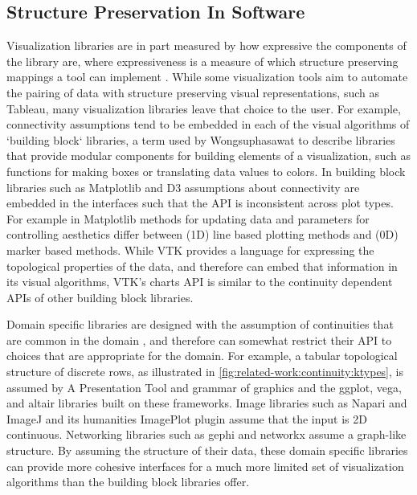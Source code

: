 \documentclass[journal]{IEEEtran}
\theoremstyle{definition}
\theoremstyle{remark}
\begin{document}
\subsection{Structure Preservation In Software}
\label{sec:related-work:software}
Visualization libraries are in part measured by how expressive the components of the library are, where expressiveness is a measure of which structure preserving mappings a tool can implement \cite{mackinlayAutomatingDesignGraphical1986}. While some visualization tools aim to automate the pairing of data with structure preserving visual representations, such as Tableau\cite{StoltePolaris2002,hanrahanVizQL2006,MackinlayShowme2007}, many visualization libraries leave that choice to the user. For example, connectivity assumptions tend to be embedded in each of the visual algorithms of `building block` libraries, a term used by Wongsuphasawat \cite{wongsuphasawatNavigatingWideWorld2021,wongsuphasawatNavigatingWideWorld2020} to describe libraries that provide modular components for building elements of a visualization, such as functions for making boxes or translating data values to colors. In building block libraries such as Matplotlib\cite{hunterMatplotlib2DGraphics2007} and D3\cite{bostockDataDrivenDocuments2011} assumptions about connectivity are embedded in the interfaces such that the API is inconsistent across plot types. For example in Matplotlib methods for updating data and parameters for controlling aesthetics differ between (1D) line based plotting methods and (0D) marker based methods. While VTK\cite{hanwellVisualizationToolkitVTK2015,geveciVTK2012} provides a language for expressing the topological properties of the data, and therefore can embed that information in its visual algorithms, VTK's charts API is similar to the continuity dependent APIs of other building block libraries.

Domain specific libraries are designed with the assumption of continuities that are common in the domain \cite{HeerSoftware2006}, and therefore can somewhat restrict their API to choices that are appropriate for the domain. For example, a tabular topological structure of discrete rows, as illustrated in \autoref{fig:related-work:continuity:ktypes}, is assumed by A Presentation Tool\cite{mackinlayAutomatingDesignGraphical1986, mackinlayAutomatingDesignGraphical1986} and grammar of graphics\cite{wilkinsonGrammarGraphics2005} and the ggplot\cite{wickhamGgplot2ElegantGraphics2016}, vega\cite{satyanarayanDeclarativeInteractionDesign2014}, and altair\cite{vanderplasAltairInteractiveStatistical2018} libraries built on these frameworks. Image libraries such as Napari\cite{nicholas_sofroniew_2021_4533308} and ImageJ\cite{schneiderNIHImageImageJ2012} and its humanities ImagePlot\cite{studiesCulturevisImageplot2021} plugin assume that the input is 2D continuous. Networking libraries such as gephi\cite{bastianGephiOpenSource2009} and networkx\cite{HagbergExploringNetwork2008} assume a graph-like structure. By assuming the structure of their data, these domain specific libraries can provide more cohesive interfaces for a much more limited set of visualization algorithms than the building block libraries offer.
\end{document}
